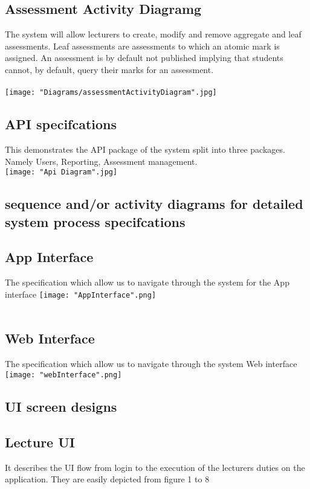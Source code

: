 \documentclass[10pt,a4paper]{article}
\begin{document}
\pagebreak
\subsection*{Assessment Activity Diagramg}
The system will allow lecturers to create, modify and remove aggregate and leaf assessments. 
Leaf assessments are assessments to which an atomic mark is assigned. An
assessment is by default not published implying that students cannot, by default, query their marks
for an assessment.\\\\
\texttt{[image: "Diagrams/assessmentActivityDiagram".jpg]}\\

\pagebreak
\subsection{API specifcations}
This demonstrates the API package of the system split into three packages. Namely Users, Reporting, Assessment management.\\
\texttt{[image: "Api Diagram".jpg]}

\subsection{sequence and/or activity diagrams for detailed system process specifcations}

\subsection*{App Interface}
The specification which allow us to navigate through the system for the App interface
\texttt{[image: "AppInterface".png]}\\\\

\subsection*{Web Interface}
The specification which allow us to navigate through the system Web interface
\texttt{[image: "webInterface".png]}\\

\subsection{UI screen designs}
\subsection*{Lecture UI}
It describes the UI flow from login to the execution of the lecturers duties on the application. They are easily depicted from figure 1 to 8 \\
\end{document}

